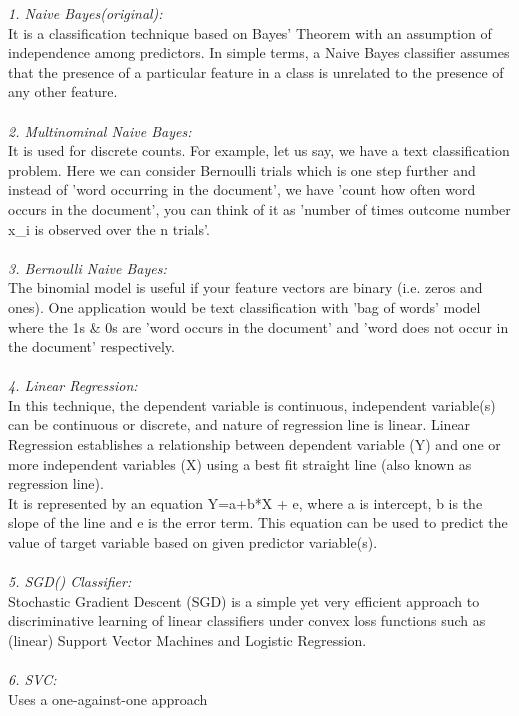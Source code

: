 \documentclass[conference]{IEEEtran}
\begin{document}
    \textit{1. Naive Bayes(original):} \\
	It is a classification technique based on Bayes’ Theorem with an assumption of independence among predictors. In simple terms, a Naive Bayes classifier assumes that the presence of a particular feature in a class is unrelated to the presence of any other feature.\\\\
    \textit{2. Multinominal Naive Bayes:}\\ 
	It is used for discrete counts. For example, let us say,  we have a text classification problem. Here we can consider Bernoulli trials which is one step further and instead of 'word occurring in the document', we have 'count how often word occurs in the document', you can think of it as 'number of times outcome number x\_i is observed over the n trials'.\\\\
    \textit{3. Bernoulli Naive Bayes: }\\
	The binomial model is useful if your feature vectors are binary (i.e. zeros and ones). One application would be text classification with 'bag of words' model where the 1s \& 0s are 'word occurs in the document' and 'word does not occur in the document' respectively.\\\\
	\textit{4. Linear Regression:} \\
	In this technique, the dependent variable is continuous, independent variable(s) can be continuous or discrete, and nature of regression line is linear. Linear Regression establishes a relationship between dependent variable (Y) and one or more independent variables (X) using a best fit straight line (also known as regression line).\\
	It is represented by an equation Y=a+b*X + e, where a is intercept, b is the slope of the line and e is the error term. This equation can be used to predict the value of target variable based on given predictor variable(s).\\\\
	\textit{5. SGD() Classifier: }\\
	Stochastic Gradient Descent (SGD) is a simple yet very efficient approach to discriminative learning of linear classifiers under convex loss functions such as (linear) Support Vector Machines and Logistic Regression.\\\\
	\textit{6. SVC:} \\
	Uses a one-against-one approach\\\\
\end{document}
